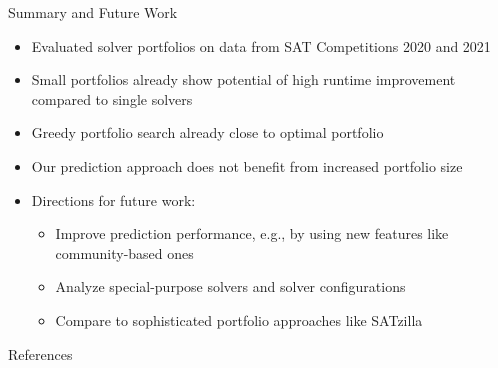 \documentclass[en]{sdqbeamer}
\begin{document}
\begin{frame}[t]{Summary and Future Work}
	\begin{itemize}
		\item Evaluated solver portfolios on data from SAT Competitions 2020 and 2021
		\pause
		\item Small portfolios already show potential of high runtime improvement compared to single solvers
		\pause
		\item Greedy portfolio search already close to optimal portfolio
		\pause
		\item Our prediction approach does not benefit from increased portfolio size
		\pause
		\vspace{\baselineskip}
		\item Directions for future work:
		\begin{itemize}
			\item Improve prediction performance, e.g., by using new features like community-based ones~\cite{Ansotegui:2019:CommunityStructure, Li:2021:HCS}
			\item Analyze special-purpose solvers and solver configurations
			\item Compare to sophisticated portfolio approaches like SATzilla~\cite{xu2008satzilla, xu2012satzilla2012}
		\end{itemize}
	\end{itemize}
\end{frame}

\appendix
\beginbackup %

\begin{frame}[t, allowframebreaks]{References}
	\printbibliography
\end{frame}

\backupend
\end{document}
